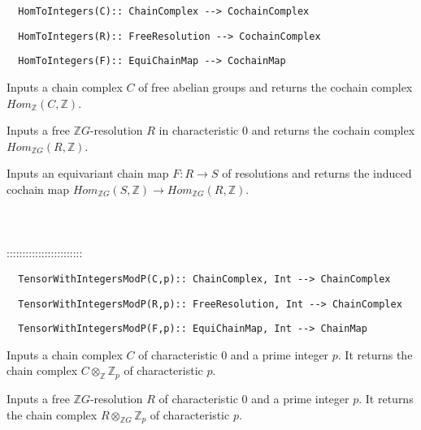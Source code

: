 \documentclass[a4paper,11pt]{report}
\begin{document}
{\begin{verbatim}  HomToIntegers(C):: ChainComplex --> CochainComplex
\end{verbatim}
 
\begin{verbatim}  HomToIntegers(R):: FreeResolution --> CochainComplex
\end{verbatim}
 
\begin{verbatim}  HomToIntegers(F):: EquiChainMap --> CochainMap
\end{verbatim}


 

 Inputs a chain complex $C$ of free abelian groups and returns the cochain complex $Hom_{\mathbb Z}(C,\mathbb Z)$. 

 Inputs a free $\mathbb ZG$-resolution $R$ in characteristic $0$ and returns the cochain complex $Hom_{\mathbb ZG}(R,\mathbb Z)$. 

 Inputs an equivariant chain map $F\colon R\rightarrow S$ of resolutions and returns the induced cochain map $Hom_{\mathbb ZG}(S,\mathbb Z) \longrightarrow Hom_{\mathbb ZG}(R,\mathbb Z)$. \\
 \\
 \\
 \\
 ::::::::::::::::::::::::\\
 
\begin{verbatim}  TensorWithIntegersModP(C,p):: ChainComplex, Int --> ChainComplex
\end{verbatim}
 
\begin{verbatim}  TensorWithIntegersModP(R,p):: FreeResolution, Int --> ChainComplex
\end{verbatim}
 
\begin{verbatim}  TensorWithIntegersModP(F,p):: EquiChainMap, Int --> ChainMap
\end{verbatim}


 

 Inputs a chain complex $C$ of characteristic $0$ and a prime integer $p$. It returns the chain complex $C \otimes_{\mathbb Z} {\mathbb Z}_p$ of characteristic $p$. 

 Inputs a free $\mathbb ZG$-resolution $R$ of characteristic $0$ and a prime integer $p$. It returns the chain complex $R \otimes_{\mathbb ZG} {\mathbb Z}_p$ of characteristic $p$. 

}
\end{document}
